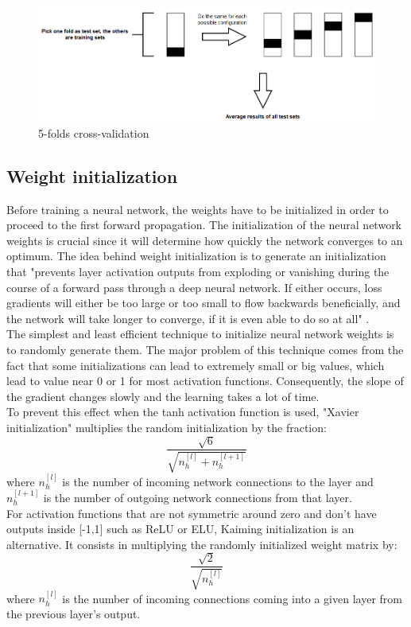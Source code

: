 \begin{figure}[!h]
\centering
\includegraphics[width=1\textwidth, keepaspectratio=true]{./figures/cross_validation.png}
\caption{5-folds cross-validation }
\label{cross_validation}
\end{figure}


\subsection{Weight initialization}
\label{weight_initialization}
Before training a neural network, the weights have to be initialized in order to proceed to the first forward propagation. The initialization of the neural network weights is crucial since it will determine how quickly the network converges to an optimum. The idea behind weight initialization is to generate an initialization that "prevents layer activation outputs from exploding or vanishing during the course of a forward pass through a deep neural network. If either occurs, loss gradients will either be too large or too small to flow backwards beneficially, and the network will take longer to converge, if it is even able to do so at all" \cite{27}.\\
The simplest and least efficient technique to initialize neural network weights is to randomly generate them. The major problem of this technique comes from the fact that some initializations can lead to extremely small or big values, which lead to value near 0 or 1 for most activation functions. Consequently, the slope of the gradient changes slowly and the learning takes a lot of time.\\
To prevent this effect when the tanh activation function is used, "Xavier initialization" multiplies the random initialization by the fraction:
\begin{equation}
\frac{\sqrt{6}}{\sqrt{n_{h}^{[l]}+n_{h}^{[l+1]}}}
\end{equation}
where $n_{h}^{[l]}$ is the number of incoming network connections to the layer and $n_{h}^{[l+1]}$ is the number of outgoing network connections from that layer.\\
For activation functions that are not symmetric around zero and don't have outputs inside [-1,1] such as ReLU or ELU, Kaiming initialization is an alternative. It consists in multiplying the randomly initialized  weight matrix by:
\begin{equation}
\frac{\sqrt{2}}{\sqrt{n_{h}^{[l]}}}
\end{equation} 
where $n_{h}^{[l]}$ is the number of incoming connections coming into a given layer from the previous layer's output.

